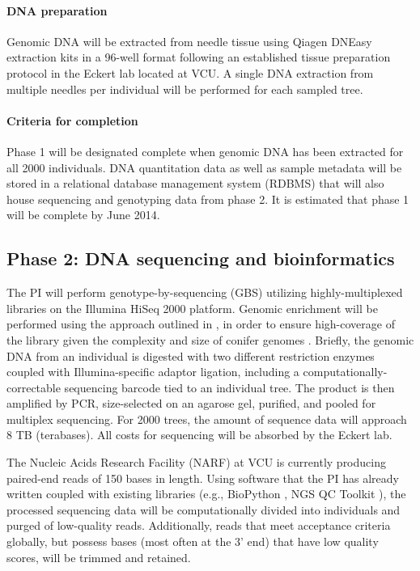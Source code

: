 \paragraph{DNA preparation}
Genomic DNA will be extracted from needle tissue using Qiagen DNEasy extraction kits in a 96-well format following an established 
tissue preparation protocol in the Eckert lab located at VCU.  A single DNA extraction from multiple needles per individual 
will be performed for each sampled tree.  

\paragraph{Criteria for completion}
Phase 1 will be designated complete when genomic DNA has been extracted for all \num{2000} individuals.  
DNA quantitation data as well as sample metadata will be stored in a relational database management system (RDBMS) 
that will also house sequencing and genotyping data from phase 2.  It is estimated that phase 1 will be complete by June 2014.

\subsection*{Phase 2: DNA sequencing and bioinformatics}

The PI will perform genotype-by-sequencing (GBS) utilizing highly-multiplexed libraries on the Illumina HiSeq 2000 platform.  
Genomic enrichment will be performed using the approach outlined in 
\cite{Parchman:2012ca}, in order to ensure high-coverage of the library given the complexity and size of conifer genomes 
\citep{Mackay:2012hr}.  Briefly, the genomic DNA from an individual is digested with two different restriction enzymes coupled 
with Illumina-specific adaptor ligation, including a computationally-correctable sequencing barcode \citep{Roche454MID} tied 
to an individual tree. 
The product is then amplified by PCR, size-selected on an agarose gel, purified, and pooled for multiplex sequencing. For 
2000 trees, the amount of sequence data will approach 8 TB (terabases).  All costs for sequencing will be absorbed by the Eckert lab.   

The Nucleic Acids Research Facility (NARF) at VCU is currently producing paired-end reads of 150 bases in length.  Using 
software that the PI has already written \citep{code:2008wq} coupled with existing libraries (e.g., BioPython \citep{Cock:2009hj}, 
NGS QC Toolkit \citep{Patel:2012fq}), the processed sequencing data will be computationally divided into individuals and purged of 
low-quality reads. Additionally, reads that meet acceptance criteria globally, but possess bases (most often at the 3' end) 
that have low quality scores, will be trimmed and retained.

